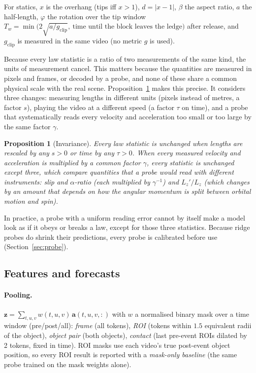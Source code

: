 \documentclass[10pt]{article}
\newtheorem{proposition}{Proposition}
\begin{document}
\noindent For statics, $x$ is the overhang (tips iff $x>1$), $d=|x-1|$, $\beta$ the aspect ratio, $a$ the half-length, $\varphi$ the
rotation over the tip window $T_w=\min\big(2\sqrt{a/g_{\mathrm{clip}}},\ \text{time until the block leaves the ledge}\big)$
after release, and $g_{\mathrm{clip}}$ is measured in the same video (no metric $g$ is used).

Because every law statistic is a ratio of two measurements of the same kind, the units of measurement cancel.
This matters because the quantities are measured in pixels and frames, or decoded by a probe, and none of these
share a common physical scale with the real scene. Proposition~\ref{prop:inv} makes this precise. It considers three
changes: measuring lengths in different units (pixels instead of metres, a factor $s$), playing the video at a
different speed (a factor $\tau$ on time), and a probe that systematically reads every velocity and acceleration too
small or too large by the same factor $\gamma$.

\begin{proposition}[Invariance]
\label{prop:inv}
Every law statistic is unchanged when lengths are rescaled by any $s>0$ or time by any $\tau>0$. When every measured
velocity and acceleration is multiplied by a common factor $\gamma$, every statistic is unchanged except three, which
compare quantities that a probe would read with different instruments: slip and $\alpha$-ratio (each multiplied by
$\gamma^{-1}$) and $L_z'/L_z$ (which changes by an amount that depends on how the angular momentum is split between
orbital motion and spin).
\end{proposition}

\noindent In practice, a probe with a uniform reading error cannot by itself make a model look as if it obeys or
breaks a law, except for those three statistics. Because ridge probes do shrink their predictions, every probe is
calibrated before use (Section~\ref{sec:probe}).



\subsection{Features and forecasts}
\paragraph{Pooling.} $\mathbf z=\sum_{t,u,v}w(t,u,v)\,\mathbf a(t,u,v,:)$ with $w$ a normalised binary mask over a
time window (pre/post/all): \emph{frame} (all tokens), \emph{ROI} (tokens within $1.5$ equivalent radii of the
object), \emph{object pair} (both objects), \emph{contact} (last pre-event ROIs dilated by 2 tokens, fixed in time). ROI
masks use each video's true post-event object position, so every ROI result is reported with a \emph{mask-only
baseline} (the same probe trained on the mask weights alone).
\end{document}
